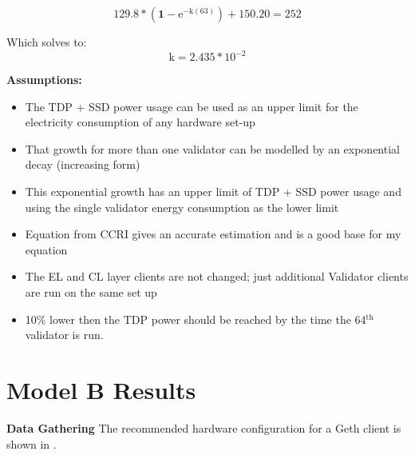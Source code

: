 \begin{equation*}
    \boldsymbol{\mathrm{129.8} * (1-\mathrm{e}^{-\mathrm{k}(\mathrm{63})}) + \mathrm{150.20} = \mathrm{252}}
\end{equation*}

Which solves to:
\begin{equation*}
    \boldsymbol{\mathrm{k} = \mathrm{{2.435} * {10}^{-2}}}
\end{equation*}












\textbf{Assumptions:}

\begin{itemize}
    \item The TDP + SSD power usage can be used as an upper limit for the electricity consumption of any hardware set-up
    \item That growth for more than one validator can be modelled by an exponential decay (increasing form)
    \item This exponential growth has an upper limit of TDP + SSD power usage and using the single validator energy consumption as the lower limit
    \item Equation from CCRI gives an accurate estimation and is a good base for my equation
    \item The EL and CL layer clients are not changed; just additional Validator clients are run on the same set up
    \item 10\% lower then the TDP power should be reached by the time the 64$^\mathrm{{th}}$ validator is run.
\end{itemize}















\section{Model B Results}

\textbf{Data Gathering}
The recommended hardware configuration for a Geth client is shown in .

